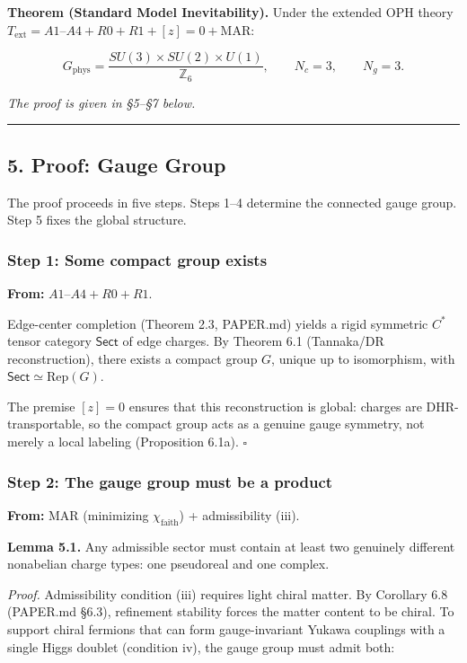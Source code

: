 \textbf{Theorem (Standard Model Inevitability).} Under the extended OPH theory \(T_{\mathrm{ext}} = A1\text{–}A4 + R0 + R1 + [z]=0 + \mathrm{MAR}\):

\[G_{\mathrm{phys}} = \frac{SU(3) \times SU(2) \times U(1)}{\mathbb{Z}_6}, \qquad N_c = 3, \qquad N_g = 3.\]

\emph{The proof is given in §5--§7 below.}

\begin{center}\rule{0.5\linewidth}{0.5pt}\end{center}

\subsection{5. Proof: Gauge Group}\label{5-proof-gauge-group}

The proof proceeds in five steps. Steps 1--4 determine the connected gauge group. Step 5 fixes the global structure.

\subsubsection{Step 1: Some compact group exists}\label{step-1-some-compact-group-exists}

\textbf{From:} \(A1\)--\(A4 + R0 + R1\).

Edge-center completion (Theorem 2.3, PAPER.md) yields a rigid symmetric \(C^*\) tensor category \(\mathsf{Sect}\) of edge charges. By Theorem 6.1 (Tannaka/DR reconstruction), there exists a compact group \(G\), unique up to isomorphism, with \(\mathsf{Sect} \simeq \mathrm{Rep}(G)\).

The premise \([z] = 0\) ensures that this reconstruction is global: charges are DHR-transportable, so the compact group acts as a genuine gauge symmetry, not merely a local labeling (Proposition 6.1a). \(\square\)

\subsubsection{Step 2: The gauge group must be a product}\label{step-2-the-gauge-group-must-be-a-product}

\textbf{From:} MAR (minimizing \(\chi_{\mathrm{faith}}\)) + admissibility (iii).

\textbf{Lemma 5.1.} Any admissible sector must contain at least two genuinely different nonabelian charge types: one pseudoreal and one complex.

\emph{Proof.} Admissibility condition (iii) requires light chiral matter. By Corollary 6.8 (PAPER.md §6.3), refinement stability forces the matter content to be chiral. To support chiral fermions that can form gauge-invariant Yukawa couplings with a single Higgs doublet (condition iv), the gauge group must admit both:

